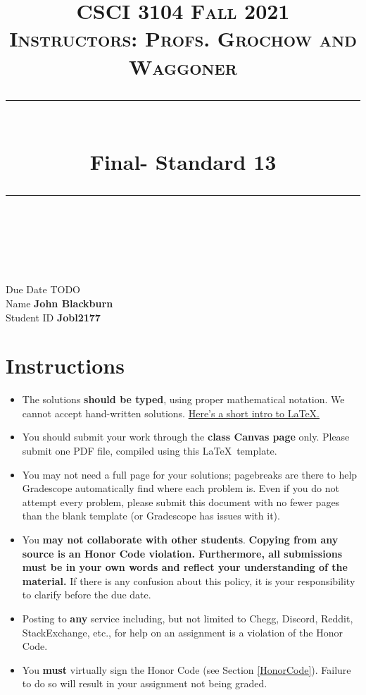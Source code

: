 \documentclass[11pt]{article}
\title{
\normalfont \normalsize 
\textsc{CSCI 3104 Fall 2021 \\ 
Instructors: Profs. Grochow and Waggoner} \\
[10pt] 
\rule{\linewidth}{0.5pt} \\[6pt] 
\huge Final- Standard 13 \\
\rule{\linewidth}{2pt}  \\[10pt]
}
\date{}
\theoremstyle{definition}
\theoremstyle{definition}
\theoremstyle{definition}
\begin{document}

\maketitle


\noindent
Due Date \dotfill TODO \\
Name \dotfill \textbf{John Blackburn} \\
Student ID \dotfill \textbf{Jobl2177} \\


\tableofcontents

\section{Instructions}
 \begin{itemize}
	\item The solutions \textbf{should be typed}, using proper mathematical notation. We cannot accept hand-written solutions. \href{http://ece.uprm.edu/~caceros/latex/introduction.pdf}{Here's a short intro to \LaTeX.}
	\item You should submit your work through the \textbf{class Canvas page} only. Please submit one PDF file, compiled using this \LaTeX \ template.
	\item You may not need a full page for your solutions; pagebreaks are there to help Gradescope automatically find where each problem is. Even if you do not attempt every problem, please submit this document with no fewer pages than the blank template (or Gradescope has issues with it).

	\item You \textbf{may not collaborate with other students}. \textbf{Copying from any source is an Honor Code violation. Furthermore, all submissions must be in your own words and reflect your understanding of the material.} If there is any confusion about this policy, it is your responsibility to clarify before the due date. 

	\item Posting to \textbf{any} service including, but not limited to Chegg, Discord, Reddit, StackExchange, etc., for help on an assignment is a violation of the Honor Code.

	\item You \textbf{must} virtually sign the Honor Code (see Section \ref{HonorCode}). Failure to do so will result in your assignment not being graded.
\end{itemize}
\end{document}

